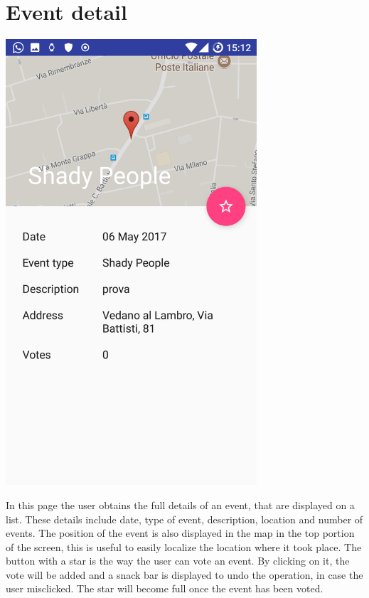 \documentclass[a4paper]{scrreprt}
\begin{document}
\section{Event detail}
\begin{minipage}{0.5\textwidth}
	\centering
	\includegraphics[width=0.7\textwidth]{event_detail}
\end{minipage}
\begin{minipage}{0.5\textwidth}
	In this page the user obtains the full details of an event, that are displayed on a list. These details include date, type of event, description, location and number of events. The position of the event is also displayed in the map in the top portion of the screen, this is useful to easily localize the location where it took place. The button with a star is the way the user can vote an event. By clicking on it, the vote will be added and a snack bar is displayed to undo the operation, in case the user misclicked. The star will become full once the event has been voted.
\end{minipage}
\end{document}

